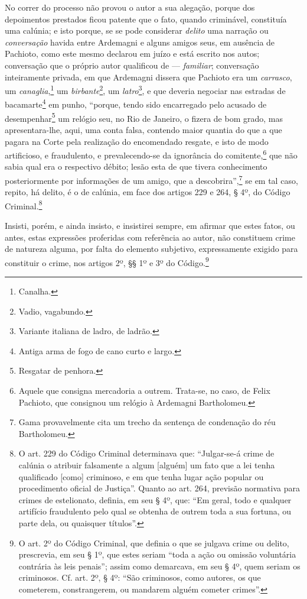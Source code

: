 No correr do processo não provou o autor a sua alegação, porque dos
depoimentos prestados ficou patente que o fato, quando criminável,
constituía uma calúnia; e isto porque, se se pode considerar
\emph{delito} uma narração ou \emph{conversação} havida entre Ardemagni
e alguns amigos seus, em ausência de Pachioto, como este mesmo declarou
em juízo e está escrito nos autos; conversação que o próprio autor
qualificou de --- \emph{familiar}; conversação inteiramente privada, em
que Ardemagni dissera que Pachioto era um \emph{carrasco}, um
\emph{canaglia},\footnote{ Canalha.} um \emph{birbante}\footnote{
  Vadio, vagabundo.}, um \emph{latro}\footnote{ Variante italiana de
  ladro, de ladrão.}, e que deveria negociar nas estradas de
bacamarte\footnote{ Antiga arma de fogo de cano curto e largo.} em
punho, ``porque, tendo sido encarregado pelo acusado de
desempenhar\footnote{ Resgatar de penhora.} um relógio seu, no Rio de
Janeiro, o fizera de bom grado, mas apresentara-lhe, aqui, uma conta
falsa, contendo maior quantia do que a que pagara na Corte pela
realização do encomendado resgate, e isto de modo artificioso, e
fraudulento, e prevalecendo-se da ignorância do comitente,\footnote{
  Aquele que consigna mercadoria a outrem. Trata-se, no caso, de Felix
  Pachioto, que consignou um relógio à Ardemagni Bartholomeu.} que não
sabia qual era o respectivo débito; lesão esta de que tivera
conhecimento posteriormente por informações de um amigo, que a
descobrira'',\footnote{ Gama provavelmente cita um trecho da sentença de
  condenação do réu Bartholomeu.} se em tal caso, repito, há delito, é o
de calúnia, em face dos artigos 229 e 264, § 4º, do Código
Criminal.\footnote{ O art. 229 do Código Criminal determinava que:
  ``Julgar-se-á crime de calúnia o atribuir falsamente a algum
  {[}alguém{]} um fato que a lei tenha qualificado {[}como{]} criminoso,
  e em que tenha lugar ação popular ou procedimento oficial de Justiça''.
  Quanto ao art. 264, previsão normativa para crimes de estelionato,
  definia, em seu § 4º, que: ``Em geral, todo e qualquer artifício
  fraudulento pelo qual se obtenha de outrem toda a sua fortuna, ou
  parte dela, ou quaisquer títulos''.}

Insisti, porém, e ainda insisto, e insistirei sempre, em afirmar que
estes fatos, ou antes, estas expressões proferidas com referência ao
autor, não constituem crime de natureza alguma, por falta do elemento
subjetivo, expressamente exigido para constituir o crime, nos artigos
2º, §§ 1º e 3º do Código.\footnote{ O art. 2º do Código Criminal, que
  definia o que se julgava crime ou delito, prescrevia, em seu § 1º, que
  estes seriam ``toda a ação ou omissão voluntária contrária às leis
  penais''; assim como demarcava, em seu § 4º, quem seriam os criminosos.
  Cf. art. 2º, § 4º: ``São criminosos, como autores, os que cometerem,
  constrangerem, ou mandarem alguém cometer crimes''.}

